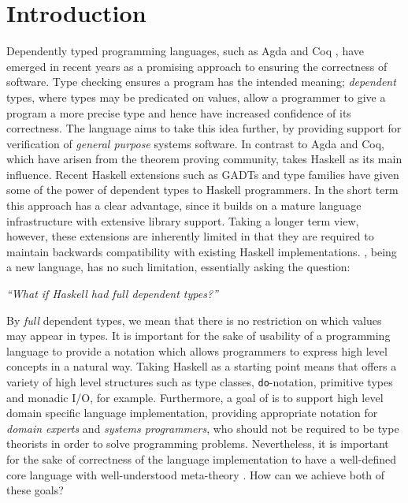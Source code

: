 \section{Introduction}

Dependently typed programming languages, such as Agda \cite{norell2007thesis}
and Coq \cite{Bertot2004}, have emerged in recent years as a promising approach
to ensuring the correctness of software. Type checking ensures a program has
the intended meaning; \emph{dependent} types, where types may be predicated
on values, allow a programmer to give a program a more precise type and 
hence have increased confidence of its correctness.
The \Idris{} language
\cite{Brady2011a} aims to take this idea further, by providing support for
verification of \emph{general purpose} systems software. In contrast to Agda and Coq,
which have arisen from the theorem proving community, \Idris{} takes Haskell as
its main influence.  Recent Haskell extensions such as GADTs and type families have
given some of the power of dependent types to Haskell programmers. In the short
term this approach has a clear advantage, since it builds on a mature language
infrastructure with extensive library support.
Taking a longer term view, however,
these extensions are inherently limited in that they are required to maintain
backwards compatibility with existing Haskell implementations.  \Idris{}, being a new
language, has no such limitation, essentially asking the question:

\begin{center}
\emph{``What if Haskell had \emph{full} dependent types?''}
\end{center}

By \emph{full} dependent types, we mean that there is no restriction on which
values may appear in types.  It is important for the sake of usability of a
programming language to provide a notation which allows programmers to express
high level concepts in a natural way. Taking Haskell as a starting point means
that \Idris{} offers a variety of high level structures such as type 
classes, \texttt{do}-notation, primitive types and monadic I/O, for example.
Furthermore, a goal of \Idris{} is to support high level domain specific
language implementation, providing appropriate notation for \emph{domain
experts} and \emph{systems programmers}, who should not be required to be type
theorists in order to solve programming problems.  Nevertheless, it is
important for the sake of correctness of the language implementation to have a
well-defined core language with well-understood meta-theory \cite{Altenkirch2010}. 
How can we achieve both of these goals?

